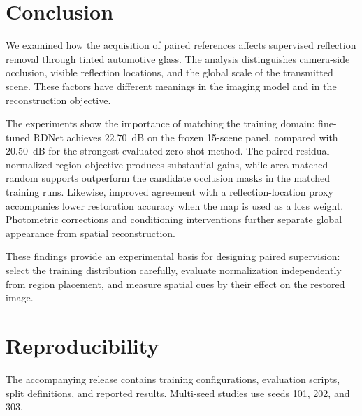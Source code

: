 \section{Conclusion}
\label{sec:concl}

We examined how the acquisition of paired references affects
supervised reflection removal through tinted automotive glass.
The analysis distinguishes camera-side occlusion, visible
reflection locations, and the global scale of the transmitted
scene. These factors have different meanings in the imaging
model and in the reconstruction objective.

The experiments show the importance of matching the training
domain: fine-tuned RDNet achieves $22.70$~dB on the frozen
15-scene panel, compared with $20.50$~dB for the strongest
evaluated zero-shot method. The paired-residual-normalized
region objective produces substantial gains, while
area-matched random supports outperform the candidate
occlusion masks in the matched training runs.
Likewise, improved agreement with a reflection-location
proxy accompanies lower restoration accuracy when the
map is used as a loss weight. Photometric corrections
and conditioning interventions further separate global
appearance from spatial reconstruction.

These findings provide an experimental basis for designing
paired supervision: select the training distribution
carefully, evaluate normalization independently from
region placement, and measure spatial cues by their
effect on the restored image.

\section*{Reproducibility}
The accompanying release contains training configurations,
evaluation scripts, split definitions, and reported results.
Multi-seed studies use seeds 101, 202, and 303.
